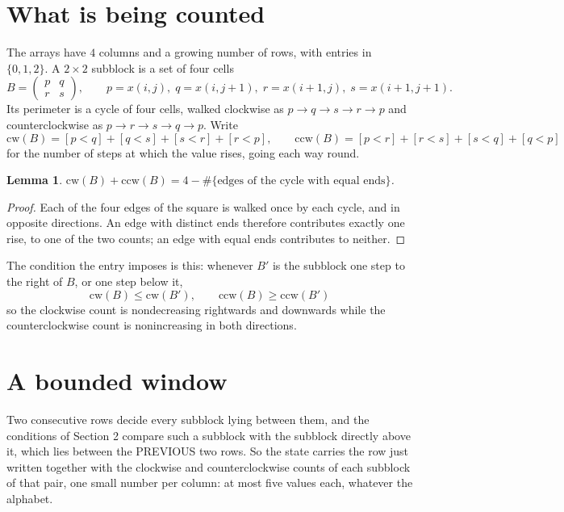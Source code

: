 \documentclass[11pt,a4paper]{article}
\theoremstyle{plain}
\newtheorem{lemma}[theorem]{Lemma}
\theoremstyle{definition}
\begin{document}
\section{What is being counted}

The arrays have $4$ columns and a growing number of rows, with entries in $\{0,1,2\}$. A
$2\times2$ subblock is a set of four cells
\[
B=\begin{pmatrix} p & q \\ r & s \end{pmatrix},
\qquad p=x(i,j),\; q=x(i,j+1),\; r=x(i+1,j),\; s=x(i+1,j+1).
\]
Its perimeter is a cycle of four cells, walked clockwise as $p\to q\to s\to r\to p$ and
counterclockwise as $p\to r\to s\to q\to p$. Write
\[
\mathrm{cw}(B)=[p<q]+[q<s]+[s<r]+[r<p],\qquad
\mathrm{ccw}(B)=[p<r]+[r<s]+[s<q]+[q<p]
\]
for the number of steps at which the value rises, going each way round.

\begin{lemma}\label{lem:sum}
$\mathrm{cw}(B)+\mathrm{ccw}(B)=4-\#\{\text{edges of the cycle with equal ends}\}$.
\end{lemma}

\begin{proof}
Each of the four edges of the square is walked once by each cycle, and in opposite directions.
An edge with distinct ends therefore contributes exactly one rise, to one of the two counts;
an edge with equal ends contributes to neither.
\end{proof}

The condition the entry imposes is this: whenever $B'$ is the subblock one step to the right of $B$, or one step below it, 
\[
\mathrm{cw}(B)\le\mathrm{cw}(B'),\qquad \mathrm{ccw}(B)\ge\mathrm{ccw}(B')
\]
so the clockwise count is nondecreasing rightwards and downwards while the counterclockwise count is nonincreasing in both directions.

\section{A bounded window}

Two consecutive rows decide every subblock lying between them, and the conditions of Section 2 compare such a subblock with the subblock directly above it, which lies between the PREVIOUS two rows. So the state carries the row just written together with the clockwise and counterclockwise counts of each subblock of that pair, one small number per column: at most five values each, whatever the alphabet.
\end{document}

